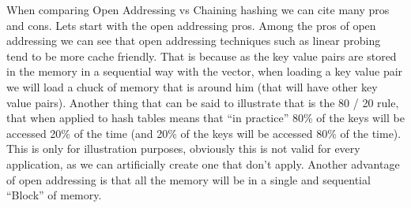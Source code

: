 When comparing Open Addressing vs Chaining hashing we can cite many pros and cons. Lets start with the open addressing pros. Among the pros of open addressing we can see that open addressing techniques such as linear probing tend to be more cache friendly. That is because as the key value pairs are stored in the memory in a sequential way with the vector, when loading a key value pair we will load a chuck of memory that is around him (that will have other key value pairs). Another thing that can be said to illustrate that is the 80 / 20 rule, that when applied to hash tables means that ``in practice'' 80\% of the keys will be accessed 20\% of the time (and 20\% of the keys will be accessed 80\% of the time). This is only for illustration purposes, obviously this is not valid for every application, as we can artificially create one that don't apply. Another advantage of open addressing is that all the memory will be in a single and sequential ``Block'' of memory. 